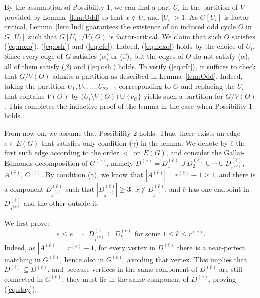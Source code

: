 \documentclass{article}
\theoremstyle{definition}
\begin{document}
By the assumption of Possibility 1, we can find a part $U_i$ in the partition of $V$ provided by Lemma~\ref{lem:Odd} so that $x \notin U_i$ and $|U_i| > 1$. As $G[U_i]$ is factor-critical, Lemma~\ref{lem:Ind} guarantees the existence of an induced odd cycle $O$ in $G[U_i]$ such that $G[U_i]/V(O)$ is factor-critical. We claim that such $O$ satisfies (\ref{eq:noxo}), (\ref{eq:osh}) and (\ref{eq:cfc}). Indeed, (\ref{eq:noxo}) holds by the choice of $U_i$. Since every edge of $G$ satisfies ($\alpha$) or ($\beta$), but the edges of $O$ do not satisfy ($\alpha$), all of them satisfy ($\beta$) and (\ref{eq:osh}) holds. To verify (\ref{eq:cfc}), it suffices to check that $G/V(O)$ admits a partition as described in Lemma~\ref{lem:Odd}. Indeed, taking the partition $U_1, U_2, \ldots , U_{2k+1}$ corresponding to $G$ and replacing the $U_i$ that contains $V(O)$ by $\bigl( U_i \setminus V(O) \bigr) \cup \{v_O\}$ yields such a partition for $G/V(O)$. This completes the inductive proof of the lemma in the case when Possibility 1 holds.

From now on, we assume that Possibility 2 holds. Thus, there exists an edge $e \in E(G)$ that satisfies only condition ($\gamma$) in the lemma. We denote by $\bar{e}$ the first such edge according to the order $<$ on $E(G)$, and consider the Gallai-Edmonds decomposition of $G^{(\bar{e})}$, namely $D^{(\bar{e})} = D_1^{(\bar{e})} \cup D_2^{(\bar{e})} \cup \cdots \cup D_{r^{(\bar{e})}}^{(\bar{e})}$, $A^{(\bar{e})}$, $C^{(\bar{e})}$. By condition ($\gamma$), we know that $|A^{(\bar{e})}| = r^{(\bar{e})} - 1 \ge 1$, and there is a component $D_{j^{(\bar{e})}}^{(\bar{e})}$ such that $|D_{j^{(\bar{e})}}^{(\bar{e})}| \ge 3$, $x \notin D_{j^{(\bar{e})}}^{(\bar{e})}$, and $\bar{e}$ has one endpoint in $D_{j^{(\bar{e})}}^{(\bar{e})}$ and the other outside it.

We first prove:
\begin{equation} \label{eq:stay}
\bar{e} \le e \,\,\Longrightarrow\,\, D_{j^{(\bar{e})}}^{(\bar{e})} \subseteq D_k^{(e)} \textrm{ for some } 1 \le k \le r^{(e)}.
\end{equation}
Indeed, as $|A^{(\bar{e})}| = r^{(\bar{e})} - 1$, for every vertex in $D^{(\bar{e})}$ there is a near-perfect matching in $G^{(\bar{e})}$, hence also in $G^{(e)}$, avoiding that vertex. This implies that $D^{(\bar{e})} \subseteq D^{(e)}$, and because vertices in the same component of $D^{(\bar{e})}$ are still connected in $G^{(e)}$, they must lie in the same component of $D^{(e)}$, proving (\ref{eq:stay}).
\end{document}
